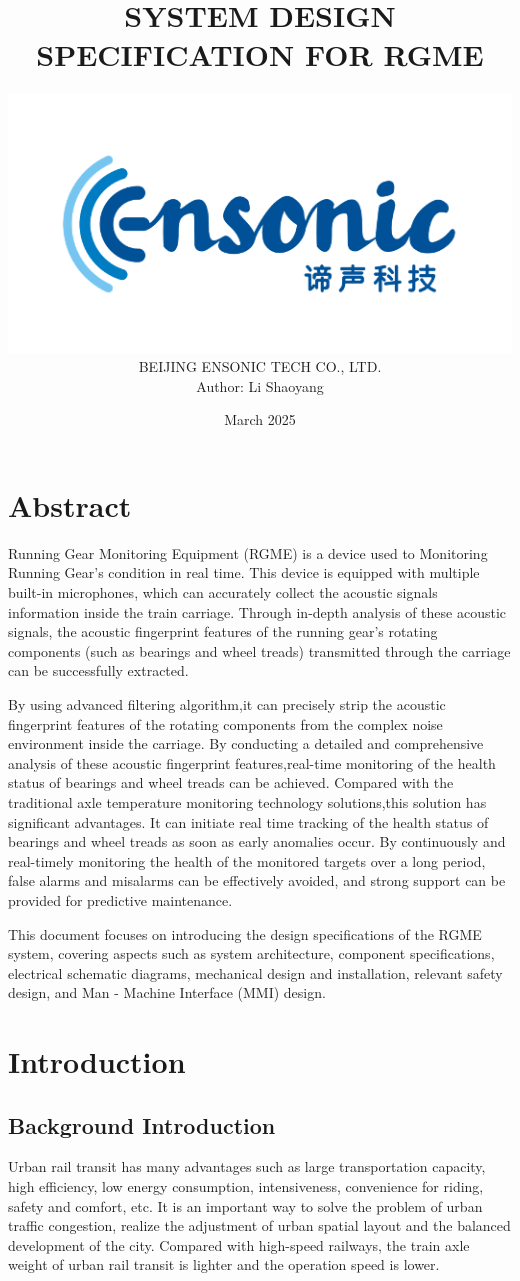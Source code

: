 \documentclass{article}
\title{\huge{ \textbf{SYSTEM DESIGN SPECIFICATION FOR RGME}}}
\author{\includegraphics[width=0.8 \columnwidth]{./Ensoniclogo.png}\\
\vspace{80mm}
BEIJING ENSONIC TECH CO., LTD.\\
Author: Li Shaoyang\\}
\date{March 2025}
\begin{document}
\maketitle
\clearpage
\tableofcontents
\clearpage
\section*{Abstract}
Running Gear Monitoring Equipment (RGME) is a device used to Monitoring Running Gear's condition in real time. This device is equipped with multiple built-in microphones, which can accurately collect the acoustic signals information inside the train carriage. Through in-depth analysis of these acoustic signals, the acoustic fingerprint features of the running gear's rotating components (such as bearings and wheel treads) transmitted through the carriage can be successfully extracted.

By using advanced filtering algorithm,it can precisely strip the acoustic fingerprint features of the rotating components from the complex noise environment inside the carriage. By conducting a detailed and comprehensive analysis of these acoustic fingerprint features,real-time monitoring of the health status of bearings and wheel treads can be achieved.
Compared with the traditional axle temperature monitoring technology solutions,this solution has significant advantages. It can initiate real time tracking of the health status of bearings and wheel treads as soon as early anomalies occur. By continuously and real-timely monitoring the health of the monitored targets over a long period, false alarms and misalarms can be effectively avoided, and strong support can be provided for predictive maintenance.

This document focuses on introducing the design specifications of the RGME system, covering aspects such as system architecture, component specifications, electrical schematic diagrams, mechanical design and installation, relevant safety design, and Man - Machine Interface (MMI) design. 
\clearpage

\section{Introduction}
\subsection{Background Introduction}
Urban rail transit has many advantages such as large transportation capacity, high efficiency, low energy consumption, intensiveness, convenience for riding, safety and comfort, etc. It is an important way to solve the problem of urban traffic congestion, realize the adjustment of urban spatial layout and the balanced development of the city. Compared with high-speed railways, the train axle weight of urban rail transit is lighter and the operation speed is lower. 
\end{document}
